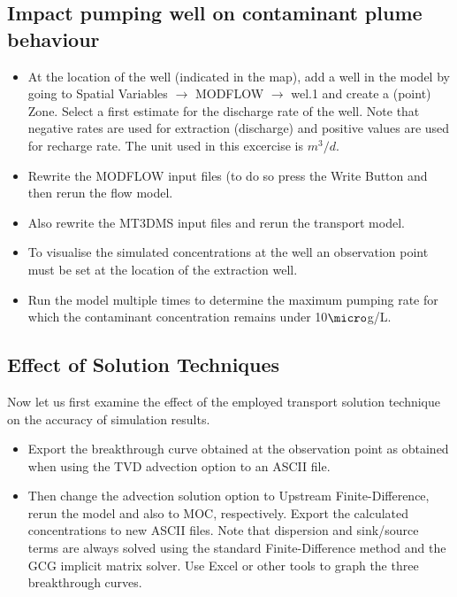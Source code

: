 \subsection{Impact pumping well on contaminant plume behaviour}

\begin{itemize}

\item At the location of the well (indicated in the map), 
add a well in the model by going to 
{\color{blue}Spatial Variables} $\rightarrow$ {\color{blue}MODFLOW} $\rightarrow$ 
{\color{blue}wel.1} and create a (point) {\color{blue}Zone}. 
Select a first estimate for the discharge rate of the well. 
Note that negative rates are used for extraction (discharge)
and positive values are used for recharge rate. 
The unit used in this excercise is $m^3/d$.

\item Rewrite the {\color{blue}MODFLOW} input files (to do so press the {\color{blue}Write Button}
and then rerun the flow model.

\item Also rewrite the {\color{blue}MT3DMS} input files and rerun the transport model.

\item To visualise the simulated concentrations at the well an observation point must be
set at the location of the extraction well.

\item Run the model multiple times to determine the maximum pumping rate for which 
the contaminant concentration remains under 10$\micro$g/L.  

\end{itemize}

\subsection{Effect of Solution Techniques}

Now let us first examine the effect of the employed transport solution technique 
on the accuracy of simulation results.

\begin{itemize}
 
\item Export the breakthrough curve obtained at the observation point as obtained when using
the TVD advection option to an ASCII file. 

\item Then change the advection solution option to Upstream Finite-Difference, rerun the model 
and also to MOC, respectively. Export the calculated concentrations to new ASCII files. 
Note that dispersion and sink/source terms are always solved using the standard 
Finite-Difference method and the GCG implicit matrix solver.
Use Excel or other tools to graph the three breakthrough curves.

\end{itemize} 

